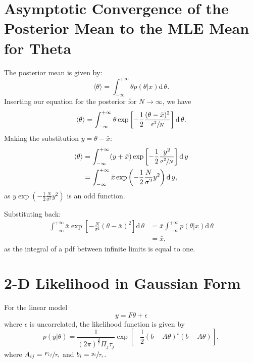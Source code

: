 \documentclass[a4paper,11pt,twoside]{article}
\begin{document}
\section{Asymptotic Convergence of the Posterior Mean to the MLE Mean for Theta}
The posterior mean is given by:
\begin{equation*}
	\langle \theta \rangle = \int_{-\infty}^{+\infty} \theta p(\theta|x) \mathrm{d} \, \theta.
\end{equation*}
Inserting our equation for the posterior for $N \rightarrow \infty$, we have
\begin{equation*}
	\langle \theta \rangle = \int_{-\infty}^{+\infty} \theta \exp \left[- \frac{1}{2} \frac{(\theta - \bar{x})^2}{\sfrac{\sigma^2}{N}} \right] \mathrm{d} \, \theta. 
\end{equation*}
Making the substitution $y = \theta - \bar{x}$:
\begin{align*}
	\langle \theta \rangle &= \int_{-\infty}^{+\infty} (y+\bar{x})  \exp \left[- \frac{1}{2} \frac{y^2}{\sfrac{\sigma^2}{N}} \right] \mathrm{d} \, y
	\\ &= \int_{-\infty}^{+\infty} \bar{x} \exp \left(- \frac{1}{2}\frac{N}{\sigma^2} y^2 \right) \mathrm{d} \, y,
\end{align*}
as $ y \exp \left(- \frac{1}{2}\frac{N}{\sigma^2} y^2 \right) $ is an odd function.

Substituting back:
\begin{align*}
	\int_{-\infty}^{+\infty} \bar{x} \exp \left[- \frac{N}{\sigma^2} (\theta - \bar{x})^2 \right] \mathrm{d} \, \theta &= \bar{x} \int_{-\infty}^{+\infty} p(\theta|x) \mathrm{d} \, \theta
	\\ &= \bar{x},
\end{align*}
as the integral of a pdf between infinite limits is equal to one. 

\section{2-D Likelihood in Gaussian Form}
\label{sec:2dlikelihood}

For the linear model
\begin{equation*}
	y = F\theta + \epsilon
\end{equation*}
where $\epsilon$ is uncorrelated, the likelihood function is given by
\begin{equation*}
	p(y|\theta) = \frac{1}{(2\pi)^{\frac{d}{2}}\Pi_j\tau_j} \exp\left[-\frac{1}{2}(b - A\theta)^t(b-A\theta)\right],
\end{equation*}
where $A_{ij} = \sfrac{F_{ij}}{\tau_i}$ and $b_i = \sfrac{y_i}{\tau_i}$.
\end{document}
